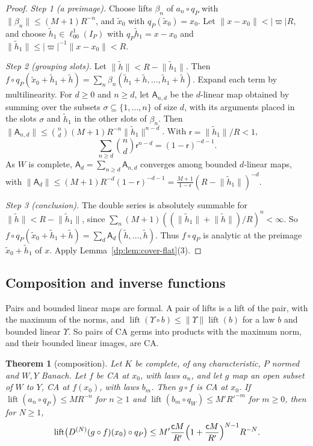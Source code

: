 \documentclass[11pt]{amsart}
\newtheorem{theorem}{Theorem}[section]
\theoremstyle{definition}
\theoremstyle{remark}
\numberwithin{equation}{section}
\newcommand{\abs}[1]{\lvert #1\rvert}
\newcommand{\norm}[1]{\lVert #1\rVert}
\theoremstyle{plain}
\theoremstyle{definition}
\theoremstyle{plain}
\begin{document}
\begin{proof}
\emph{Step 1 (a preimage).} Choose lifts $\beta_n$ of $a_n\circ q_P$ with $\norm{\beta_n}\le(M+1)R^{-n}$, and $\tilde x_0$ with $q_P(\tilde x_0)=x_0$. Let $\norm{x-x_0}<\abs\varpi R$, and choose $\tilde h_1\in\ell^1_{00}(I_P)$ with $q_P\tilde h_1=x-x_0$ and $\norm{\tilde h_1}\le\abs\varpi^{-1}\norm{x-x_0}<R$.

\emph{Step 2 (grouping slots).} Let $\norm{\tilde h}<R-\norm{\tilde h_1}$. Then $f\circ q_P(\tilde x_0+\tilde h_1+\tilde h)=\sum_n\beta_n(\tilde h_1+\tilde h,\dots,\tilde h_1+\tilde h)$. Expand each term by multilinearity. For $d\ge0$ and $n\ge d$, let $\mathsf A_{n,d}$ be the $d$-linear map obtained by summing over the subsets $\sigma\subseteq\{1,\dots,n\}$ of size $d$, with its arguments placed in the slots $\sigma$ and $\tilde h_1$ in the other slots of $\beta_n$. Then $\norm{\mathsf A_{n,d}}\le\binom nd(M+1)R^{-n}\norm{\tilde h_1}^{n-d}$. With $\mathsf r=\norm{\tilde h_1}/R<1$,
\[
 \sum_{n\ge d}\binom nd\mathsf r^{n-d}=(1-\mathsf r)^{-d-1}.
\]
As $W$ is complete, $\mathsf A_d=\sum_{n\ge d}\mathsf A_{n,d}$ converges among bounded $d$-linear maps, with $\norm{\mathsf A_d}\le(M+1)R^{-d}(1-\mathsf r)^{-d-1}=\frac{M+1}{1-\mathsf r}(R-\norm{\tilde h_1})^{-d}$.

\emph{Step 3 (conclusion).} The double series is absolutely summable for $\norm{\tilde h}<R-\norm{\tilde h_1}$, since $\sum_n(M+1)((\norm{\tilde h_1}+\norm{\tilde h})/R)^n<\infty$. So $f\circ q_P(\tilde x_0+\tilde h_1+\tilde h)=\sum_d\mathsf A_d(\tilde h,\dots,\tilde h)$. Thus $f\circ q_P$ is analytic at the preimage $\tilde x_0+\tilde h_1$ of $x$. Apply Lemma~\ref{dp:lem:cover-flat}(3).
\end{proof}

\subsection{Composition and inverse functions}\label{dp:ssec:ca-calculus}

Pairs and bounded linear maps are formal. A pair of lifts is a lift of the pair, with the maximum of the norms, and $\operatorname{lift}(\Upsilon\circ b)\le\norm\Upsilon\operatorname{lift}(b)$ for a law $b$ and bounded linear $\Upsilon$. So pairs of CA germs into products with the maximum norm, and their bounded linear images, are CA.

\begin{theorem}[composition]\label{dp:thm:ca-composition}
Let $K$ be complete, of any characteristic, $P$ normed and $W,Y$ Banach. Let $f$ be CA at $x_0$, with laws $a_n$, and let $g$ map an open subset of $W$ to $Y$, CA at $f(x_0)$, with laws $b_m$. Then $g\circ f$ is CA at $x_0$. If $\operatorname{lift}(a_n\circ q_P)\le MR^{-n}$ for $n\ge1$ and $\operatorname{lift}(b_m\circ q_W)\le M'R'^{-m}$ for $m\ge0$, then for $N\ge1$,
\[
 \operatorname{lift}\bigl(D^{(N)}(g\circ f)(x_0)\circ q_P\bigr)\le M'\frac{\mathsf cM}{R'}\Bigl(1+\frac{\mathsf cM}{R'}\Bigr)^{N-1}R^{-N}.
\]
\end{theorem}
\end{document}
